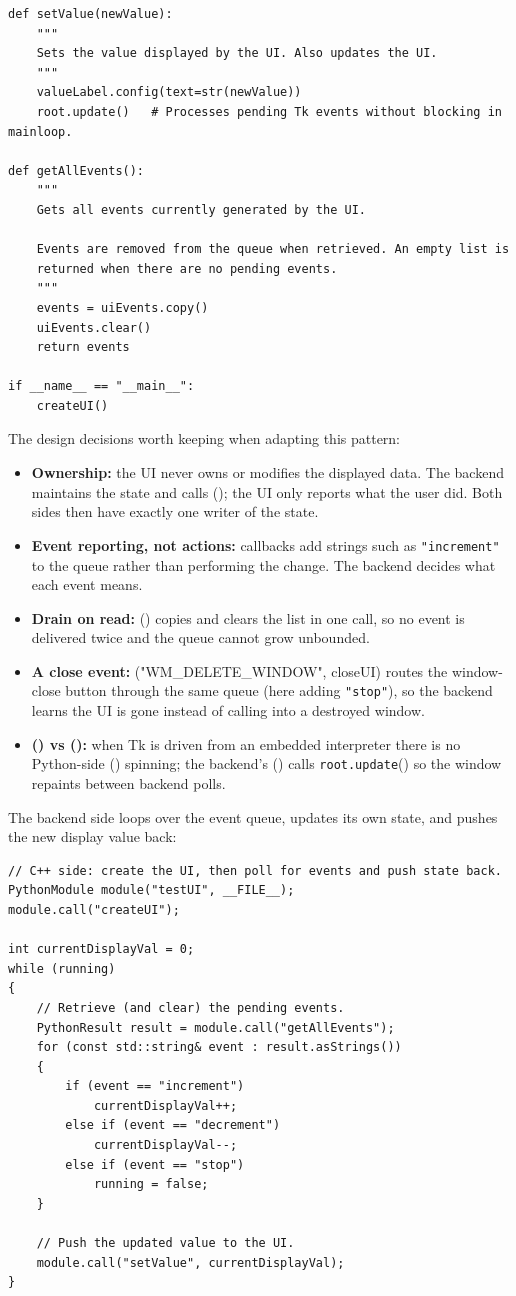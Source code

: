 \begin{lstlisting}
def setValue(newValue):
    """
    Sets the value displayed by the UI. Also updates the UI.
    """
    valueLabel.config(text=str(newValue))
    root.update()   # Processes pending Tk events without blocking in mainloop.

def getAllEvents():
    """
    Gets all events currently generated by the UI.

    Events are removed from the queue when retrieved. An empty list is
    returned when there are no pending events.
    """
    events = uiEvents.copy()
    uiEvents.clear()
    return events

if __name__ == "__main__":
    createUI()
\end{lstlisting}
The design decisions worth keeping when adapting this pattern:
\begin{itemize}\itemsep0em
	\item \textbf{Ownership:} the UI never owns or modifies the displayed data. The backend maintains the state and calls (); the UI only reports what the user did. Both sides then have exactly one writer of the state.
	\item \textbf{Event reporting, not actions:} callbacks add strings such as \texttt{"increment"} to the queue rather than performing the change. The backend decides what each event means.
	\item \textbf{Drain on read:} () copies and clears the list in one call, so no event is delivered twice and the queue cannot grow unbounded.
	\item \textbf{A close event:} ("WM\_DELETE\_WINDOW", closeUI) routes the window-close button through the same queue (here adding \texttt{"stop"}), so the backend learns the UI is gone instead of calling into a destroyed window.
	\item \textbf{() vs ():} when Tk is driven from an embedded interpreter there is no Python-side () spinning; the backend's () calls \texttt{root.update}() so the window repaints between backend polls.
\end{itemize}
The backend side loops over the event queue, updates its own state, and pushes the new display value back:
\begin{lstlisting}
// C++ side: create the UI, then poll for events and push state back.
PythonModule module("testUI", __FILE__);
module.call("createUI");

int currentDisplayVal = 0;
while (running)
{
    // Retrieve (and clear) the pending events.
    PythonResult result = module.call("getAllEvents");
    for (const std::string& event : result.asStrings())
    {
        if (event == "increment")
            currentDisplayVal++;
        else if (event == "decrement")
            currentDisplayVal--;
        else if (event == "stop")
            running = false;
    }

    // Push the updated value to the UI.
    module.call("setValue", currentDisplayVal);
}
\end{lstlisting}
